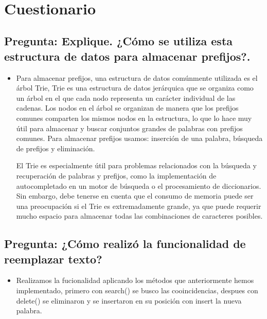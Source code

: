 \documentclass{article}
\begin{document}
	
\begin{lstlisting}[style=ascii-tree]
        
\end{lstlisting}  

\section{Cuestionario}
\subsection{Pregunta: Explique. ¿Cómo se utiliza esta estructura de datos para almacenar prefijos?.}
	\begin{itemize}
	\item  	Para almacenar prefijos, una estructura de datos comúnmente utilizada es el árbol Trie, Trie es una estructura de datos jerárquica que se organiza como un árbol en el que cada nodo representa un carácter individual de las cadenas. Los nodos en el árbol se organizan de manera que los prefijos comunes comparten los mismos nodos en la estructura, lo que lo hace muy útil para almacenar y buscar conjuntos grandes de palabras con prefijos comunes. Para almacenar prefijos usamos: inserción de una palabra, búsqueda de prefijos y eliminación.

El Trie es especialmente útil para problemas relacionados con la búsqueda y recuperación de palabras y prefijos, como la implementación de autocompletado en un motor de búsqueda o el procesamiento de diccionarios. Sin embargo, debe tenerse en cuenta que el consumo de memoria puede ser una preocupación si el Trie es extremadamente grande, ya que puede requerir mucho espacio para almacenar todas las combinaciones de caracteres posibles.

	
	\end{itemize}
	\subsection{Pregunta: ¿Cómo realizó la funcionalidad de reemplazar texto?}
	\begin{itemize}
	\item Realizamos la fucionalidad aplicando los métodos que anteriormente hemos implementado, primero con
	search() se busco las cooincidencias, despues con delete() se eliminaron y se insertaron en su posición con insert
	la nueva palabra.  	

	
	\end{itemize}		
	
\end{document}
